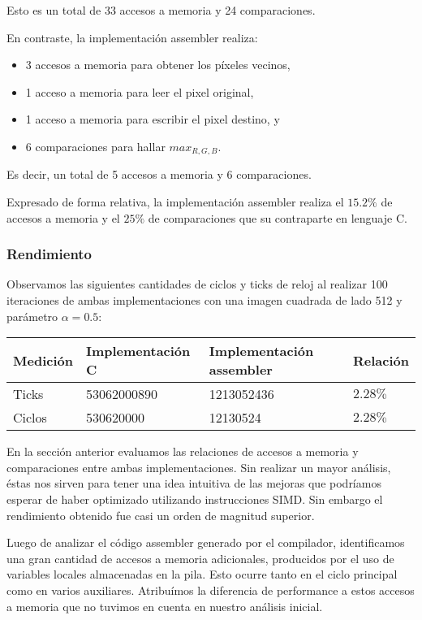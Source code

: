 Esto es un total de 33 accesos a memoria y 24 comparaciones.

En contraste, la implementación assembler realiza:

\begin{itemize}
    \item 3 accesos a memoria para obtener los píxeles vecinos,
    \item 1 acceso a memoria para leer el pixel original,
    \item 1 acceso a memoria para escribir el pixel destino, y
    \item 6 comparaciones para hallar $max_{R,G,B}$.
\end{itemize}

Es decir, un total de 5 accesos a memoria y 6 comparaciones.

Expresado de forma relativa, la implementación assembler realiza
el $15.2\%$ de accesos a memoria y el $25\%$ de comparaciones que su
contraparte en lenguaje C.




\subsubsection{Rendimiento}

Observamos las siguientes cantidades de ciclos y ticks de reloj al realizar 100 iteraciones de ambas implementaciones con una imagen cuadrada de lado 512 y parámetro $\alpha = 0.5$:

\begin{center}
    \begin{tabular}{|l|l|l|l|}
        \hline
        Medición & Implementación C & Implementación assembler & Relación \\
        \hline
        Ticks    & 53062000890      & 1213052436               & $2.28\%$ \\
        Ciclos   & 530620000        & 12130524                 & $2.28\%$ \\
        \hline
    \end{tabular}
\end{center}

En la sección anterior evaluamos las relaciones de accesos a memoria y comparaciones
entre ambas implementaciones. Sin realizar un mayor análisis, éstas nos sirven
para tener una idea intuitiva de las mejoras que podríamos esperar de haber optimizado
utilizando instrucciones SIMD. Sin embargo el rendimiento obtenido fue casi un orden
de magnitud superior.

Luego de analizar el código assembler generado por el compilador, identificamos una
gran cantidad de accesos a memoria adicionales, producidos por el uso de variables locales
almacenadas en la pila. Esto ocurre tanto en el ciclo principal como en varios auxiliares.
Atribuímos la diferencia de performance a estos accesos a memoria que no tuvimos en cuenta
en nuestro análisis inicial.